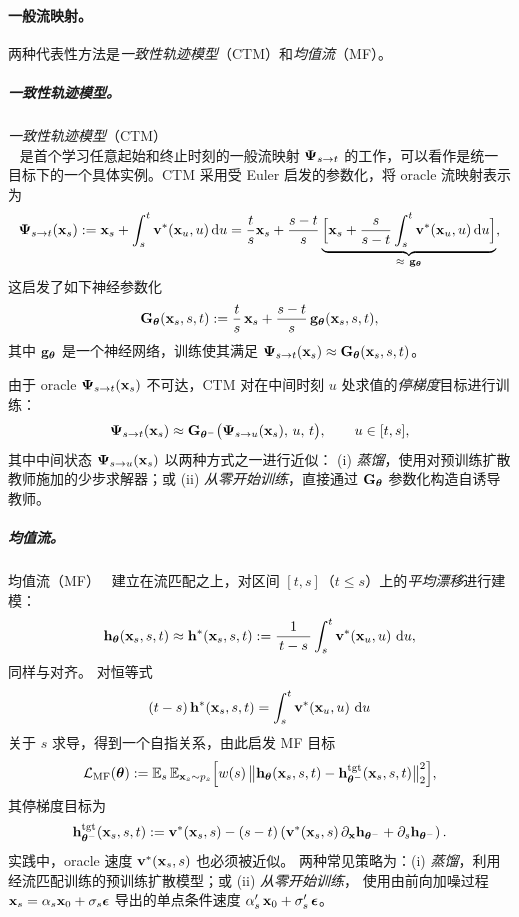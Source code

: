 \paragraph{一般流映射。} 两种代表性方法是\emph{一致性轨迹模型}（CTM）和\emph{均值流}（MF）。
\subparagraph{一致性轨迹模型。} \emph{一致性轨迹模型}（CTM）\\~\citep{kim2023consistency} 是首个学习任意起始和终止时刻的一般流映射 ${\bm{\Psi}}_{s\to t}$ 的工作，可以看作是统一目标下的一个具体实例。CTM 采用受 Euler 启发的参数化，将 oracle 流映射表示为
\begin{align*}
{\bm{\Psi}}_{s\to t}({\mathbf{x}}_s)
:= {\mathbf{x}}_s + \int_s^t {\mathbf{v}}^*({\mathbf{x}}_u,u)\mathop{}\!\mathrm{d} u 
= \frac{t}{s} {\mathbf{x}}_s
+ \frac{s-t}{s}
\underbrace{\Big[{\mathbf{x}}_s + \frac{s}{s-t} \int_s^t {\mathbf{v}}^*({\mathbf{x}}_u,u) \mathop{}\!\mathrm{d} u\Big]}_{\approx~{\mathbf{g}}_{{\bm{\theta}}}},
\end{align*}
这启发了如下神经参数化
\begin{align}\label{eq:ctm_para_1}
{\mathbf{G}}_{{\bm{\theta}}}({\mathbf{x}}_s,s,t)
:= \frac{t}{s}\,{\mathbf{x}}_s + \frac{s-t}{s}\,{\mathbf{g}}_{\bm{\theta}}({\mathbf{x}}_s,s,t),
\end{align}
其中 ${\mathbf{g}}_{\bm{\theta}}$ 是一个神经网络，训练使其满足 ${\bm{\Psi}}_{s\to t}({\mathbf{x}}_s)\approx {\mathbf{G}}_{{\bm{\theta}}}({\mathbf{x}}_s,s,t)$。

由于 oracle ${\bm{\Psi}}_{s\to t}({\mathbf{x}}_s)$ 不可达，CTM 对在中间时刻 $u$ 处求值的\emph{停梯度}目标进行训练：
\[
{\bm{\Psi}}_{s\to t}({\mathbf{x}}_s)
 \approx
{\mathbf{G}}_{{\bm{\theta}}^-} \big({\bm{\Psi}}_{s\to u}({\mathbf{x}}_s),\,u,\,t\big),
\qquad u\in[t,s],
\]
其中中间状态 ${\bm{\Psi}}_{s\to u}({\mathbf{x}}_s)$ 以两种方式之一进行近似：
(i) \emph{蒸馏}，使用对预训练扩散教师施加的少步求解器；或
(ii) \emph{从零开始训练}，直接通过 ${\mathbf{G}}_{\bm{\theta}}$ 参数化构造自诱导教师。


\subparagraph{均值流。}
均值流（MF）~\citep{geng2025mean} 建立在流匹配之上，对区间 $[t,s]$（$t\le s$）上的\emph{平均漂移}进行建模：
\[
{\mathbf{h}}_{{\bm{\theta}}}({\mathbf{x}}_s,s,t)
 \approx 
{\mathbf{h}}^*({\mathbf{x}}_s,s,t)
:= \frac{1}{\,t-s\,}\int_s^t {\mathbf{v}}^*({\mathbf{x}}_u,u)\,\mathop{}\!\mathrm{d} u,
\]
同样与对齐。
对恒等式
\[
(t-s)\,{\mathbf{h}}^*({\mathbf{x}}_s,s,t)  =  \int_s^t {\mathbf{v}}^*({\mathbf{x}}_u,u)\,\mathop{}\!\mathrm{d} u
\]
关于 $s$ 求导，得到一个自指关系，由此启发 MF 目标
\[
\mathcal{L}_{\mathrm{MF}}({\bm{\theta}})
:= \mathbb{E}_s\,\mathbb{E}_{{\mathbf{x}}_s\sim p_s} \Big[w(s)\,\big\|
{\mathbf{h}}_{{\bm{\theta}}}({\mathbf{x}}_s,s,t)-{\mathbf{h}}_{{\bm{\theta}}^-}^{\mathrm{tgt}}({\mathbf{x}}_s,s,t)
\big\|_2^2\Big],
\]
其停梯度目标为
\[
{\mathbf{h}}_{{\bm{\theta}}^-}^{\mathrm{tgt}}({\mathbf{x}}_s,s,t)
:= {\mathbf{v}}^*({\mathbf{x}}_s,s)  -  (s-t) \left({\mathbf{v}}^*({\mathbf{x}}_s,s)\,\partial_{\mathbf{x}} {\mathbf{h}}_{{\bm{\theta}}^-} + \partial_s {\mathbf{h}}_{{\bm{\theta}}^-}\right).
\]
实践中，oracle 速度 ${\mathbf{v}}^*({\mathbf{x}}_s,s)$ 也必须被近似。
两种常见策略为：(i) \emph{蒸馏}，利用经流匹配训练的预训练扩散模型；或 (ii) \emph{从零开始训练}，
使用由前向加噪过程 ${\mathbf{x}}_s = \alpha_s {\mathbf{x}}_0+\sigma_s {\bm{\epsilon}}$ 导出的单点条件速度
$\alpha'_s\,{\mathbf{x}}_0+\sigma'_s\,{\bm{\epsilon}}$。



